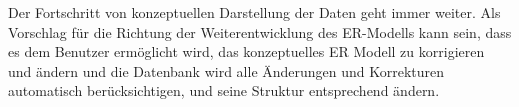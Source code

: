 Der Fortschritt von konzeptuellen Darstellung der Daten geht immer weiter. Als Vorschlag für die Richtung der Weiterentwicklung des ER-Modells kann sein, dass es dem Benutzer ermöglicht wird, das konzeptuelles ER Modell zu korrigieren und ändern und die Datenbank wird alle Änderungen und Korrekturen automatisch berücksichtigen, und seine Struktur entsprechend ändern. 






